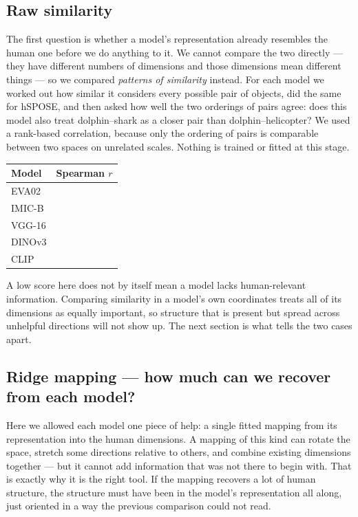 \documentclass[11pt]{article}
\begin{document}
\subsection{Raw similarity}

The first question is whether a model's representation already resembles the human one before we do
anything to it. We cannot compare the two directly --- they have different numbers of dimensions and
those dimensions mean different things --- so we compared \emph{patterns of similarity} instead. For
each model we worked out how similar it considers every possible pair of objects, did the same for
hSPOSE, and then asked how well the two orderings of pairs agree: does this model also treat
dolphin--shark as a closer pair than dolphin--helicopter? We used a rank-based correlation, because
only the ordering of pairs is comparable between two spaces on unrelated scales. Nothing is trained
or fitted at this stage.

\begin{center}
\begin{tabular}{@{}lc@{}}
\toprule
\textbf{Model} & \textbf{Spearman }$r$ \\
\midrule
EVA02 & \\
IMIC-B & \\
VGG-16 & \\
DINOv3 & \\
CLIP & \\
\bottomrule
\end{tabular}
\end{center}

A low score here does not by itself mean a model lacks human-relevant information. Comparing
similarity in a model's own coordinates treats all of its dimensions as equally important, so
structure that is present but spread across unhelpful directions will not show up. The next section
is what tells the two cases apart.

\subsection{Ridge mapping --- how much can we recover from each model?}

Here we allowed each model one piece of help: a single fitted mapping from its representation into
the human dimensions. A mapping of this kind can rotate the space, stretch some directions relative
to others, and combine existing dimensions together --- but it cannot add information that was not
there to begin with. That is exactly why it is the right tool. If the mapping recovers a lot of
human structure, the structure must have been in the model's representation all along, just
oriented in a way the previous comparison could not read.
\end{document}
